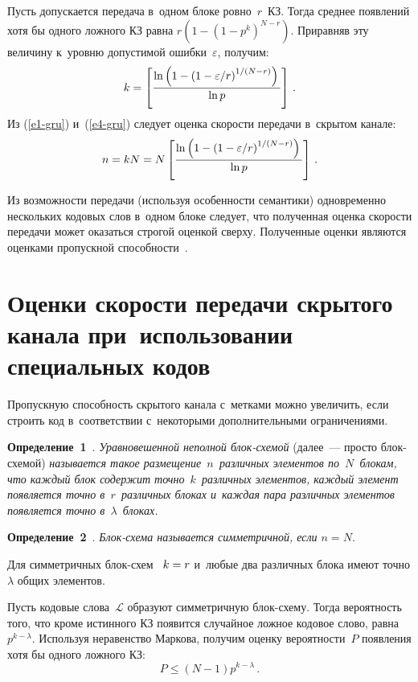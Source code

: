 \begin{multicols}{2}
  Пусть допускается передача в~одном блоке ров\-но~$r$~КЗ. Тогда среднее 
появлений хотя бы одного ложного КЗ равна $r(1-(1-p^k)^{N-r})$.
  Приравняв эту величину к~уровню допустимой ошибки~$\varepsilon$, 
получим:
  \begin{equation}
  k=\left[ \displaystyle\frac{\displaystyle \ln\left(1-\left(1-\varepsilon/r\right)^{1/(N-r)}\right)\mathstrut}{\displaystyle \ln p\mathstrut}\right]\,.
  \label{e4-gru}
  \end{equation}
  Из (\ref{e1-gru}) и~(\ref{e4-gru}) следует оценка скорости передачи в~скрытом 
канале:
  $$
  n=kN=N\left[ \displaystyle\frac{\displaystyle \ln\left(1-\left(1-\varepsilon/r\right)^{1/(N-r)}\right)\mathstrut}{\displaystyle \ln p\mathstrut}\right]\,.
  $$
  
  Из возможности передачи (используя особенности семантики) одновременно 
нескольких кодовых слов в~одном блоке следует, что полученная оценка 
скорости передачи может оказаться строгой оценкой сверху. Полученные 
оценки являются оценками пропускной способности~\cite{6-gru}. 
  
\section{Оценки скорости передачи скрытого канала 
при~использовании специальных кодов}

  Пропускную способность скрытого канала с~метками можно увеличить, если 
строить код в~соответствии с~некоторыми дополнительными ограничениями.
  
  \smallskip
  
  \noindent
  \textbf{Определение~1}~\cite{7-gru}. \textit{Уравновешенной неполной  
блок-схе\-мой} (далее~--- просто блок-схе\-мой) \textit{называется такое 
размещение~$n$~различных элементов по~$N$~блокам, что каждый блок 
содержит точно~$k$~различных элементов, каждый элемент появляется точно 
в~$r$~различных блоках и~каждая пара различных элементов появляется точно 
в~$\lambda$~блоках.} 
  
  \smallskip
  
  \noindent
  \textbf{Определение~2}~\cite{7-gru}. \textit{Блок-схе\-ма называется 
сим\-мет\-рич\-ной, если $n = N$}. 
  
  \smallskip
  
  
  Для симметричных блок-схем~\cite{7-gru} $k\hm= r$ и~любые два 
различных блока имеют точно $\lambda$ общих элементов. 
  
  Пусть кодовые слова~$\mathcal{L}$ образуют симметричную блок-схе\-му. 
Тогда вероятность того, что кроме истинного КЗ появится случайное ложное 
кодовое слово, равна $p^{k-\lambda}$. Используя неравенство Маркова, 
получим оценку вероятности~$P$ появления хотя бы одного ложного КЗ:
  $$
  P\leq (N-1) p^{k-\lambda}\,.
  $$
  

\end{multicols}
